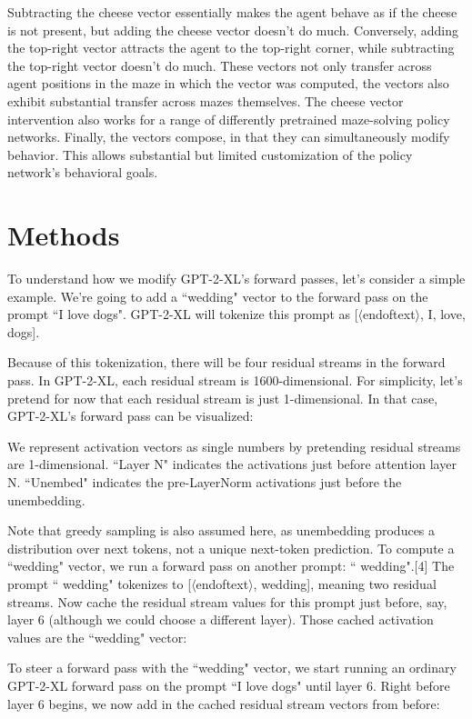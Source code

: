\documentclass[10pt]{article}
\newcommand{\eot}{$\langle$\textbar endoftext\textbar$\rangle$}
\begin{document}
Subtracting the cheese vector essentially makes the agent behave as if the cheese is not present, but adding the cheese vector doesn't do much. Conversely, adding the top-right vector attracts the agent to the top-right corner, while subtracting the top-right vector doesn't do much. These vectors not only transfer across agent positions in the maze in which the vector was computed, the vectors also exhibit substantial transfer across mazes themselves. The cheese vector intervention also works for a range of differently pretrained maze-solving policy networks. Finally, the vectors compose, in that they can simultaneously modify behavior. This allows substantial but limited customization of the policy network's behavioral goals.

\section{Methods}
To understand how we modify GPT-2-XL's forward passes, let's consider a simple example. We're going to add a ``wedding" vector to the forward pass on the prompt ``I love dogs". GPT-2-XL will tokenize this prompt as [\eot, I,  love,  dogs].

Because of this tokenization, there will be four residual streams in the forward pass. In GPT-2-XL, each residual stream is 1600-dimensional. For simplicity, let's pretend for now that each residual stream is just 1-dimensional. In that case, GPT-2-XL's forward pass can be visualized:

We represent activation vectors as single numbers by pretending residual streams are 1-dimensional. ``Layer N" indicates the activations just before attention layer N. ``Unembed" indicates the pre-LayerNorm activations just before the unembedding.

Note that greedy sampling is also assumed here, as unembedding produces a distribution over next tokens, not a unique next-token prediction. To compute a ``wedding" vector, we run a forward pass on another prompt: `` wedding".[4] The prompt `` wedding" tokenizes to [\eot,  wedding], meaning two residual streams. Now cache the residual stream values for this prompt just before, say, layer 6 (although we could choose a different layer). Those cached activation values are the ``wedding" vector:

To steer a forward pass with the ``wedding" vector, we start running an ordinary GPT-2-XL forward pass on the prompt ``I love dogs" until layer 6. Right before layer 6 begins, we now add in the cached residual stream vectors from before:
\end{document}
